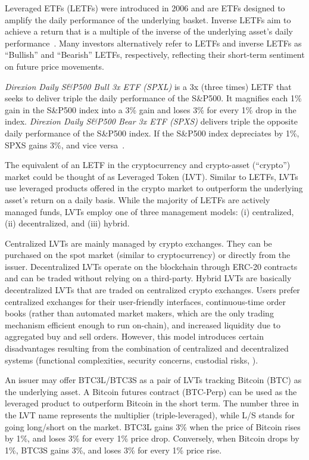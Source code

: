 Leveraged ETFs (LETFs) were introduced in 2006 and are ETFs designed to amplify the daily performance of the underlying basket. Inverse LETFs aim to achieve a return that is a multiple of the inverse of the underlying asset’s daily performance~\cite{hill2009understanding,cheng2009dynamics,SEC}. Many investors alternatively refer to LETFs and inverse LETFs as ``Bullish'' and ``Bearish'' LETFs, respectively, reflecting their short-term sentiment on future price movements.
\begin{example}
	\textsl{Direxion Daily S\&P500 Bull 3x ETF (SPXL)} is a 3x (three times) LETF that seeks to deliver triple the daily performance of the S\&P500. It magnifies each 1\% gain in the S\&P500 index into a 3\% gain and loses 3\% for every 1\% drop in the index. \textsl{Direxion Daily S\&P500 Bear 3x ETF (SPXS)} delivers triple the opposite daily performance of the S\&P500 index. If the S\&P500 index depreciates by 1\%, SPXS gains 3\%, and vice versa~\cite{wided2019properties,lettau2018exchange}.
\end{example}

The equivalent of an LETF in the cryptocurrency and crypto-asset (``crypto'') market could be thought of as Leveraged Token (LVT). Similar to LETFs, LVTs use leveraged products offered in the crypto market to outperform the underlying asset’s return on a daily basis. While the majority of LETFs are actively managed funds, LVTs employ one of three management models: (i) centralized, (ii) decentralized, and (iii) hybrid. 

Centralized LVTs are mainly managed by crypto exchanges. They can be purchased on the spot market (similar to cryptocurrency) or directly from the issuer. Decentralized LVTs operate on the blockchain through ERC-20 contracts and can be traded without relying on a third-party. Hybrid LVTs are basically decentralized LVTs that are traded on centralized crypto exchanges. Users prefer centralized exchanges for their user-friendly interfaces, continuous-time order books (rather than automated market makers, which are the only trading mechanism efficient enough to run on-chain), and increased liquidity due to aggregated buy and sell orders. However, this model introduces certain disadvantages resulting from the combination of centralized and decentralized systems (\eg functional complexities, security concerns, custodial risks, \etc).

\begin{example}
	An issuer may offer BTC3L/BTC3S as a pair of LVTs tracking Bitcoin (BTC) as the underlying asset. A Bitcoin futures contract (BTC-Perp) can be used as the leveraged product to outperform Bitcoin in the short term. The number three in the LVT name represents the multiplier (triple-leveraged), while L/S stands for going long/short on the market. BTC3L gains 3\% when the price of Bitcoin rises by 1\%, and loses 3\% for every 1\% price drop. Conversely, when Bitcoin drops by 1\%, BTC3S gains 3\%, and loses 3\% for every 1\% price rise.
\end{example}

